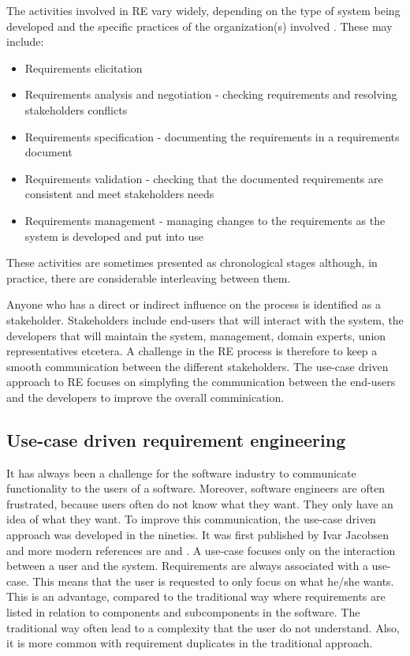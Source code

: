 The activities involved in RE vary widely, depending on the type of system being developed and the specific practices of the organization(s) involved  \cite{Som11}.  These may include:
\begin{itemize}
\item Requirements elicitation 
\item Requirements analysis and negotiation - checking requirements and resolving stakeholders conflicts
\item Requirements specification - documenting the requirements in a requirements document
\item Requirements validation - checking that the documented requirements are consistent and meet stakeholders needs
\item Requirements management - managing changes to the requirements as the system is developed and put into use
\end{itemize}

These activities are sometimes presented as chronological stages although, in practice, there  are considerable interleaving between them.  

Anyone who has a direct or indirect influence on the process is identified as a stakeholder.   Stakeholders include end-users that will interact with the system, the developers that will maintain the system, management, domain experts, union representatives etcetera.  A challenge in the RE process is therefore to keep a smooth communication between the different stakeholders.  The use-case driven approach to RE focuses on simplyfing the communication between the end-users and the developers to improve the overall comminication.

\subsection{Use-case driven requirement engineering}
\label{sec:use-case-driven}
It has always been a challenge for the software industry to communicate functionality to the users of a software. Moreover, software engineers are often frustrated, because users often do not know what they want. They only have an idea of what they want.  To improve this communication, the use-case driven approach was developed in the nineties.  It was first published by Ivar Jacobsen \cite{Jac92} and more modern references are \cite{Poh10} and \cite{Coc01}.  A use-case focuses only on the interaction between a user and the system.  Requirements are always associated with a use-case. This means that the user is requested to only focus on what he/she wants.  This is an advantage, compared to the traditional way where requirements are listed in relation to components and subcomponents in the software.  The traditional way often lead to a complexity that the user do not understand.  Also, it is more common with requirement duplicates in the traditional approach.

